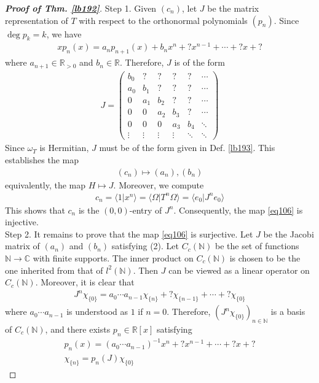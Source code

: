 \documentclass[12pt,b5paper,notitlepage]{article}
\theoremstyle{definition}
\theoremstyle{plain}
\newcommand{\bk}[1]{\langle {#1}\rangle}
\newcommand{\Cbb}{\mathbb C}
\newcommand{\Nbb}{\mathbb N}
\newcommand{\Rbb}{\mathbb R}
\numberwithin{equation}{section}
\begin{document}
\begin{proof}[\textbf{Proof of Thm. \ref{lb192}}]
Step 1. Given $(c_n)$, let $J$ be the matrix representation of $T$ with respect to the orthonormal polynomials $(p_n)$. Since $\deg p_k=k$, we have
\begin{align}
xp_n(x)=a_np_{n+1}(x)+ b_n x^n+? x^{n-1}+\cdots+? x+?
\end{align}
where $a_{n+1}\in\Rbb_{>0}$ and $b_n\in\Rbb$. Therefore, $J$ is of the form
\begin{align*}
J=\begin{pmatrix}
b_0&?&?&?&?&\cdots\\
a_0&b_1&?&?&?&\cdots\\
0&a_1&b_2&?&?&\cdots\\
0&0&a_2&b_3&?&\cdots\\
0&0&0&a_3&b_4&\ddots\\
\vdots&\vdots&\vdots&\vdots&\ddots&\ddots
\end{pmatrix}
\end{align*}
Since $\omega_T$ is Hermitian, $J$ must be of the form given in Def. \ref{lb193}. This establishes the map
\begin{align}\label{eq106}
(c_n)\mapsto (a_n),(b_n)
\end{align}
equivalently, the map $H\mapsto J$. Moreover, we compute
\begin{align*}
c_n=\bk{1|x^n}=\bk{\Omega|T^n\Omega}=\bk{e_0|J^n e_0}
\end{align*}
This shows that $c_n$ is the $(0,0)$-entry of $J^n$. Consequently, the map \eqref{eq106} is injective.\\[-1ex]

Step 2. It remains to prove that the map \eqref{eq106} is surjective. Let $J$ be the Jacobi matrix of $(a_n)$ and $(b_n)$ satisfying (2). Let $C_c(\Nbb)$ be the set of functions $\Nbb\rightarrow\Cbb$ with finite supports. The inner product on $C_c(\Nbb)$ is chosen to be the one inherited from that of $l^2(\Nbb)$. Then $J$ can be viewed as a linear operator on $C_c(\Nbb)$. Moreover, it is clear that
\begin{align*}
J^n\chi_{\{0\}}=a_0\cdots a_{n-1} \chi_{\{n\}}+?\chi_{\{n-1\}}+\cdots+?\chi_{\{0\}}
\end{align*}
where $a_0\cdots a_{n-1}$ is understood as $1$ if $n=0$. Therefore, $(J^n\chi_{\{0\}})_{n\in\Nbb}$ is a basis of $C_c(\Nbb)$, and there exists $p_n\in\Rbb[x]$ satisfying
\begin{subequations}\label{eq108}
\begin{gather}
p_n(x)=(a_0\cdots a_{n-1})^{-1}x^n+?x^{n-1}+\cdots+?x+?\label{eq108a}\\
\chi_{\{n\}}=p_n(J)\chi_{\{0\}}\label{eq108b}
\end{gather}
\end{subequations}



\end{proof}
\end{document}

